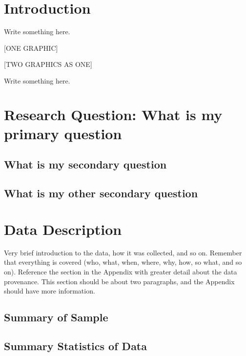 \documentclass[]{article}
\begin{document}
\vskip -8.5pt




\noindent  

\section{Introduction}
\label{sec:intro}

Write something here.

{[}ONE GRAPHIC{]}

{[}TWO GRAPHICS AS ONE{]}

Write something here.

\section{Research Question:  What is my primary question}
\label{sec:rq}

\subsection{What is my secondary question}
\label{sec:rq2}

\subsection{What is my other secondary question}
\label{sec:rq3}

\section{Data Description}
\label{sec:data}

Very brief introduction to the data, how it was collected, and so on.
Remember that everything is covered (who, what, when, where, why, how,
so what, and so on). Reference the section in the Appendix with greater
detail about the data provenance. This section should be about two
paragraphs, and the Appendix should have more information.

\subsection{Summary of Sample}
\label{sec:data-sample}

\subsection{Summary Statistics of Data}
\label{sec:data-summary}
\end{document}
